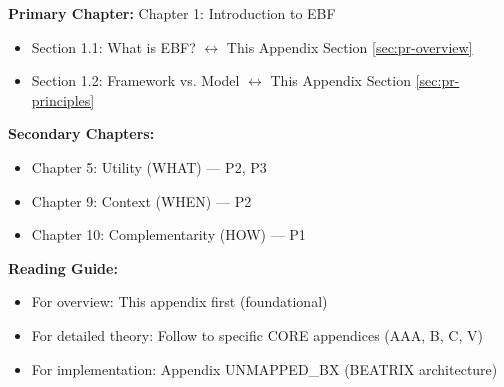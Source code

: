 %
%

%
%
%
%

\begin{tcolorbox}[colback=purple!5!white, colframe=purple!75!black,
    title=Chapter Linkage]

\textbf{Primary Chapter:} Chapter 1: Introduction to EBF
\begin{itemize}[nosep]
\item Section 1.1: What is EBF? $\leftrightarrow$ This Appendix Section \ref{sec:pr-overview}
\item Section 1.2: Framework vs. Model $\leftrightarrow$ This Appendix Section \ref{sec:pr-principles}
\end{itemize}

\textbf{Secondary Chapters:}
\begin{itemize}[nosep]
\item Chapter 5: Utility (WHAT) --- P2, P3
\item Chapter 9: Context (WHEN) --- P2
\item Chapter 10: Complementarity (HOW) --- P1
\end{itemize}

\textbf{Reading Guide:}
\begin{itemize}[nosep]
\item For overview: This appendix first (foundational)
\item For detailed theory: Follow to specific CORE appendices (AAA, B, C, V)
\item For implementation: Appendix UNMAPPED_BX (BEATRIX architecture)
\end{itemize}

\end{tcolorbox}


